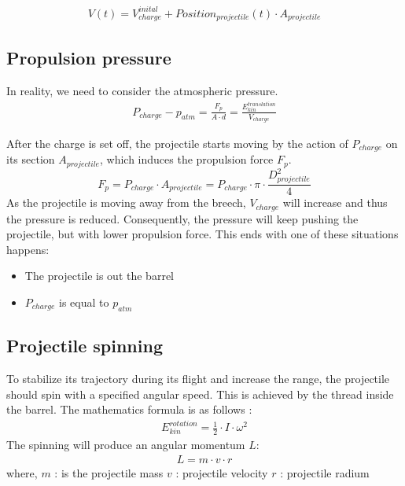 \documentclass[12pt,a4paper]{article}
\begin{document}
	\begin{eqnarray}
		V(t) = V_{charge}^{inital} + Position_{projectile}(t) \cdot A_{projectile}
	\end{eqnarray}
	
	\subsection{Propulsion pressure}
	
	In reality, we need to consider the atmospheric pressure. 
	\begin{eqnarray}
		P_{charge} - p_{atm} = \frac{F_p}{A \cdot d} = \frac{E_{kin}^{translation}}{V_{charge}}
	\end{eqnarray}
	
	
	After the charge is set off, the projectile starts moving by the action of $P_{charge}$ on its section $A_{projectile}$, which induces the propulsion force $F_p$. 
	\begin{equation}
		F_p = P_{charge} \cdot A_{projectile} =  P_{charge} \cdot \pi \cdot \frac{D_{projectile}^2}{4}
	\end{equation}
	As the projectile is moving away from the breech, $ V_{charge}$ will increase and thus the pressure is reduced. Consequently, the pressure will keep pushing the projectile, but with lower propulsion force. This ends with one of these situations happens:  
	\begin{itemize}
		\item The projectile is out the barrel
		\item $P_{charge}$ is equal to $p_{atm}$
	\end{itemize}
	
	\subsection{Projectile spinning}
	To stabilize its trajectory during its flight and increase the range, the projectile should spin with a specified angular speed. This is achieved by the thread inside the barrel. The mathematics formula is as follows :  
	\begin{eqnarray}
		E_{kin}^{rotation} = \frac{1}{2} \cdot I \cdot \omega ^ 2
	\end{eqnarray}
	The spinning will produce an angular momentum $L$:
	\begin{eqnarray}
		L = m \cdot v \cdot r
	\end{eqnarray}
	where, 
	$m$ : is the projectile mass
	$v$ : projectile velocity
	$r$ : projectile radium
	
\end{document}
